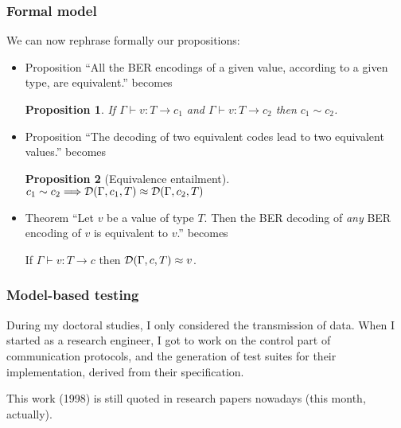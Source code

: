 \documentclass[compress,dvips,xcolor={dvipsnames},t]{beamer}
\newtheorem{proposition}{Proposition}
\newcommand{\coding}[4]{#1 \vdash #2 : #3 \rightarrow #4}
\newcommand{\decoding}[3]{{\cal D}(#1,#2,#3)}
\begin{document}
\begin{frame}
\frametitle{Formal model}

We can now rephrase formally our propositions:
\begin{itemize}

  \item Proposition ``All the BER encodings of a given value,
  according to a given type, are equivalent.'' becomes

  \begin{proposition}
    If $\coding{\Gamma}{v}{T}{c_1}$ and $\coding{\Gamma}{v}{T}{c_2}$
    then $c_1 \sim c_2$.
  \end{proposition}

  \item Proposition ``The decoding of two equivalent codes lead to two
  equivalent values.'' becomes

  \begin{proposition}[Equivalence entailment]
    $c_1 \sim c_2 \Longrightarrow \decoding{\Gamma}{c_1}{T} \approx
    \decoding{\Gamma}{c_2}{T}$
  \end{proposition}

  \item Theorem ``Let $v$ be a value of type $T$. Then the BER
    decoding of \emph{any} BER encoding of $v$ is equivalent to $v$.''
    becomes

  \begin{theorem}[Soundness]
    If $\coding{\Gamma}{v}{T}{c}$ then $\decoding{\Gamma}{c}{T}
    \approx v$.
  \end{theorem}

\end{itemize}

\end{frame}

\begin{frame}
\frametitle{Model-based testing}

During my doctoral studies, I only considered the transmission of
data. When I started as a research engineer, I got to work on the
control part of communication protocols, and the generation of test
suites for their implementation, derived from their specification.

\bigskip

This work (1998) is still quoted in research papers nowadays (this
month, actually).

\end{frame}
\end{document}
